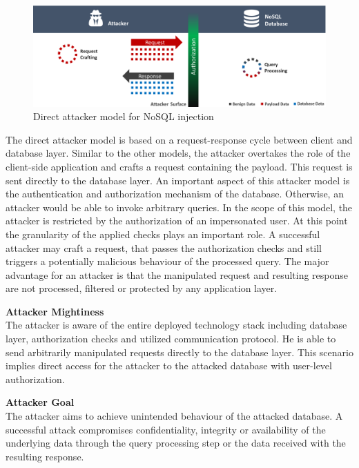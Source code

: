 \begin{figure}[h]
\centering
  \includegraphics[width=1\linewidth]{Images/attacker_model_direct}
  \caption{Direct attacker model for NoSQL injection}
  \label{fig:directAttackerModel}
\end{figure}

The direct attacker model is based on a request-response cycle between client and database layer. Similar to the other models, the attacker overtakes the role of the client-side application and crafts a request containing the payload. This request is sent directly to the database layer. An important aspect of this attacker model is the authentication and authorization mechanism of the database. Otherwise, an attacker would be able to invoke arbitrary queries. In the scope of this model, the attacker is restricted by the authorization of an impersonated user. At this point the granularity of the applied checks plays an important role. A successful attacker may craft a request, that passes the authorization checks and still triggers a potentially malicious behaviour of the processed query. The major advantage for an attacker is that the manipulated request and resulting response are not processed, filtered or protected by any application layer. \\

\begin{minipage}[t]{0.48\textwidth}
  \textbf{Attacker Mightiness} \\ 
  The attacker is aware of the entire deployed technology stack including database layer, authorization checks and utilized communication protocol. He is able to send arbitrarily manipulated requests directly to the database layer. This scenario implies direct access for the attacker to the attacked database with user-level authorization.
\end{minipage}
\hfill
\begin{minipage}[t]{0.48\textwidth}
  \textbf{Attacker Goal} \\ 
  The attacker aims to achieve unintended behaviour of the attacked database. A successful attack compromises confidentiality, integrity or availability of the underlying data through the query processing step or the data received with the resulting response.
\end{minipage}

